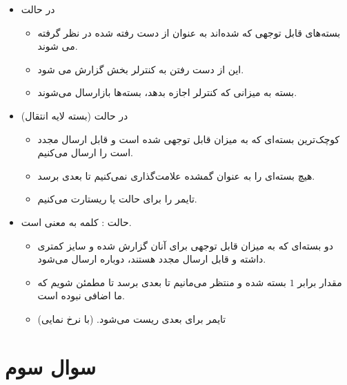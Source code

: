 \documentclass[12pt]{article}
\begin{document}
\begin{enumerate}
\begin{itemize}
\begin{itemize}
\item در حالت 

\begin{itemize}
	\item بسته‌های قابل توجهی که  شده‌اند به عنوان از دست رفته شده در نظر گرفته می شوند.
	
	\item این از دست رفتن به کنترلر بخش  گزارش می شود.
	
	\item بسته به میزانی که کنترلر  اجازه بدهد، بسته‌ها بازارسال می‌شوند.
	\end{itemize}

\item در حالت  (بسته لایه انتقال)

\begin{itemize}
	\item کوچک‌‌ترین بسته‌ای که به میزان قابل توجهی  شده است و قابل ارسال مجدد است را ارسال می‌کنیم.
	
	\item هیچ بسته‌ای را به عنوان گمشده علامت‌گذاری نمی‌کنیم تا  بعدی برسد.
	
	\item
	تایمر را برای حالت  یا  ریستارت می‌کنیم.
\end{itemize}

\item حالت :
کلمه  به معنی  است.

\begin{itemize}
	\item دو بسته‌ای که به میزان قابل توجهی  برای آنان گزارش شده و سایز کمتری داشته و قابل ارسال مجدد هستند، دوباره ارسال می‌شود.
	
	\item
	
	مقدار  برابر $1$ بسته شده و منتظر می‌مانیم تا  بعدی برسد تا مطمئن شویم که  ما اضافی نبوده است.
	
	\item
	تایمر برای  بعدی ریست می‌شود. (با نرخ  نمایی)
\end{itemize}
\end{itemize}
\end{itemize}

\end{enumerate}

\newpage
\section{سوال سوم}
\end{document}

